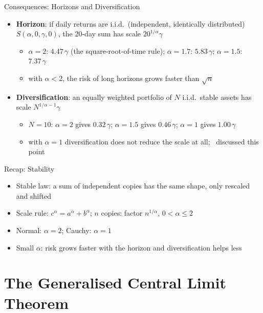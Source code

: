 \begin{frame}{Consequences: Horizons and Diversification}
\itemsize{\small}
\begin{itemize}
    \item \textbf{Horizon}: if daily returns are i.i.d.\ (independent, identically distributed) $S(\alpha, 0, \gamma, 0)$, the 20-day sum has scale $20^{1/\alpha}\gamma$
    \begin{itemize}
        \item $\alpha = 2$: $4.47\,\gamma$ (the square-root-of-time rule); $\alpha = 1.7$: $5.83\,\gamma$; $\alpha = 1.5$: $7.37\,\gamma$
        \item with $\alpha < 2$, the risk of long horizons grows faster than $\sqrt{n}$
    \end{itemize}
    \item \textbf{Diversification}: an equally weighted portfolio of $N$ i.i.d.\ stable assets has scale $N^{1/\alpha - 1}\gamma$
    \begin{itemize}
        \item $N = 10$: $\alpha = 2$ gives $0.32\,\gamma$; $\alpha = 1.5$ gives $0.46\,\gamma$; $\alpha = 1$ gives $1.00\,\gamma$
        \item with $\alpha = 1$ diversification does not reduce the scale at all; \ discussed this point
    \end{itemize}
\end{itemize}
\end{frame}

\begin{frame}{Recap: Stability}
\itemsize{\small}
\begin{itemize}
    \item Stable law: a sum of independent copies has the same shape, only rescaled and shifted
    \item Scale rule: $c^\alpha = a^\alpha + b^\alpha$; $n$ copies: factor $n^{1/\alpha}$, $0 < \alpha \le 2$
    \item Normal: $\alpha = 2$; Cauchy: $\alpha = 1$
    \item Small $\alpha$: risk grows faster with the horizon and diversification helps less
\end{itemize}
\end{frame}


\section{The Generalised Central Limit Theorem}


